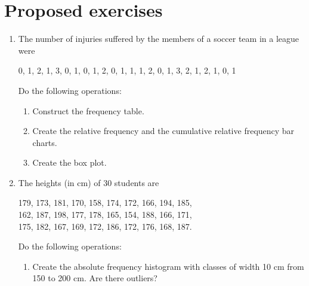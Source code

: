 \section{Proposed exercises}
\begin{enumerate}[leftmargin=*]

\item The number of injuries suffered by the members of a soccer team in a league were
\begin{center}
0, 1, 2, 1, 3, 0, 1, 0, 1, 2, 0, 1, 1, 1, 2, 0, 1, 3, 2, 1, 2, 1, 0, 1
\end{center}

Do the following operations:
\begin{enumerate}
\item Construct the frequency table.
\item Create the relative frequency and the cumulative relative frequency bar charts.
\item Create the box plot.
\end{enumerate}

\item The heights (in cm) of 30 students are 
\begin{center}
179, 173, 181, 170, 158, 174, 172, 166, 194, 185,\\
162, 187, 198, 177, 178, 165, 154, 188, 166, 171,\\
175, 182, 167, 169, 172, 186, 172, 176, 168, 187.
\end{center}

Do the following operations:
\begin{enumerate}
\item Create the absolute frequency histogram with classes of width 10 cm from 150 to 200 cm. Are there outliers?
\end{enumerate}


\end{enumerate}
